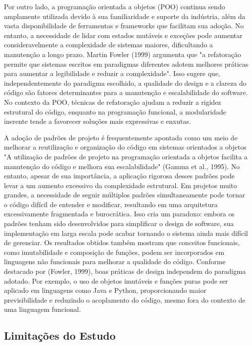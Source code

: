 Por outro lado, a programação orientada a objetos (POO) continua sendo amplamente utilizada devido à sua familiaridade e suporte da indústria, além da vasta disponibilidade de ferramentas e frameworks que facilitam sua adoção. No entanto, a necessidade de lidar com estados mutáveis e exceções pode aumentar consideravelmente a complexidade de sistemas maiores, dificultando a manutenção a longo prazo.
Martin Fowler (1999) argumenta que "a refatoração permite que sistemas escritos em paradigmas diferentes adotem melhores práticas para aumentar a legibilidade e reduzir a complexidade". Isso sugere que, independentemente do paradigma escolhido, a qualidade do design e a clareza do código são fatores determinantes para a manutenção e escalabilidade do software. No contexto da POO, técnicas de refatoração ajudam a reduzir a rigidez estrutural do código, enquanto na programação funcional, a modularidade inerente tende a favorecer soluções mais expressivas e enxutas.

A adoção de padrões de projeto é frequentemente apontada como um meio de melhorar a reutilização e organização do código em sistemas orientados a objetos "A utilização de padrões de projeto na programação orientada a objetos facilita a manutenção do código e melhora sua escalabilidade" (Gamma et al., 1995). No entanto, apesar de sua importância, a aplicação rigorosa desses padrões pode levar a um aumento excessivo da complexidade estrutural. Em projetos muito grandes, a necessidade de seguir múltiplos padrões simultaneamente pode tornar o código difícil de entender e modificar, resultando em uma arquitetura excessivamente fragmentada e burocrática. Isso cria um paradoxo: embora os padrões tenham sido desenvolvidos para simplificar o design de software, sua implementação em larga escala pode acabar tornando o sistema ainda mais difícil de gerenciar.
Os resultados obtidos também mostram que conceitos funcionais, como imutabilidade e composição de funções, podem ser incorporados em linguagens não funcionais para melhorar a qualidade do código. Conforme destacado por (Fowler, 1999), boas práticas de design independem do paradigma adotado. Por exemplo, o uso de objetos imutáveis e funções puras pode ser aplicado em linguagens como Java e Python, proporcionando maior previsibilidade e reduzindo o acoplamento do código, mesmo fora do contexto de uma linguagem funcional.

\subsection{Limitações do Estudo}

